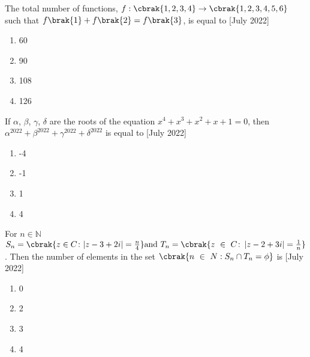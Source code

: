 \iffalse
\title{Assignment}
\author{ee24btech11059}
\section{mcq-single}
\fi
    \item{
          	The total number of functions, $f : \cbrak{1, 2, 3, 4} \to \cbrak{1, 2, 3, 4, 5, 6}$ such that $f\brak{1} + f\brak{2} = f\brak{3}$, is equal to \text{  }\hfill
                {[July 2022]}
                \begin{multicols}{4}
					\begin{enumerate}
						\item 60
						\item 90
						\item 108
						\item 126
					\end{enumerate}
				\end{multicols}
            }
    \item{
           	If $\alpha$, $\beta$, $\gamma$, $\delta$ are the roots of the equation $x^4 + x^3 + x^2 + x + 1 = 0$, then $\alpha^{2022} + \beta^{2022} + \gamma^{2022} + \delta^{2022}$ is equal to
           	\hfill
           	{[July 2022]}
                \begin{multicols}{4}
                	\begin{enumerate}
                		\item -4
                		\item -1
                		\item 1
                		\item 4
                	\end{enumerate}
                \end{multicols}
        }
\item{
        	
        	For $n \in \mathbb{N}$  $S_n=\cbrak{z\in C\colon |z-3+2i|=\frac{n}{4} } \text{and}~ T_n=\cbrak{ z\ \in\ C \colon \left|z-2+3i\right|=\frac{1}{n}}$. Then the number of elements in the set $ \cbrak{n\ \in\ N: S_n\cap T_n=\phi}$ is
        	\hfill
        	{[July 2022]}
        	\begin{multicols}{4}
        		\begin{enumerate}
        			\item 0
        			\item 2
        			\item 3
        			\item 4
        		\end{enumerate}
        	\end{multicols}
        	
        }
